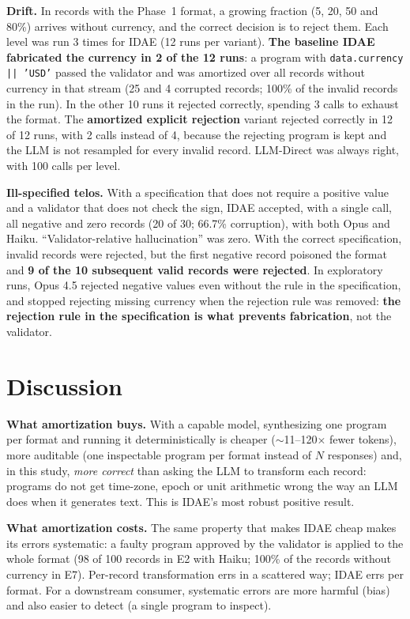 \documentclass[sigconf,nonacm]{acmart}
\begin{document}
\textbf{Drift.} In records with the Phase~1 format, a growing fraction (5, 20, 50 and 80\%) arrives without currency, and the correct decision is to reject them. Each level was run 3 times for IDAE (12 runs per variant). \textbf{The baseline IDAE fabricated the currency in 2 of the 12 runs}: a program with \texttt{data.currency || 'USD'} passed the validator and was amortized over all records without currency in that stream (25 and 4 corrupted records; 100\% of the invalid records in the run). In the other 10 runs it rejected correctly, spending 3 calls to exhaust the format. The \textbf{amortized explicit rejection} variant rejected correctly in 12 of 12 runs, with 2 calls instead of 4, because the rejecting program is kept and the LLM is not resampled for every invalid record. LLM-Direct was always right, with 100 calls per level.

\textbf{Ill-specified telos.} With a specification that does not require a positive value and a validator that does not check the sign, IDAE accepted, with a single call, all negative and zero records (20 of 30; 66.7\% corruption), with both Opus and Haiku. ``Validator-relative hallucination'' was zero. With the correct specification, invalid records were rejected, but the first negative record poisoned the format and \textbf{9 of the 10 subsequent valid records were rejected}. In exploratory runs, Opus 4.5 rejected negative values even without the rule in the specification, and stopped rejecting missing currency when the rejection rule was removed: \textbf{the rejection rule in the specification is what prevents fabrication}, not the validator.

\section{Discussion}

\textbf{What amortization buys.} With a capable model, synthesizing one program per format and running it deterministically is cheaper ($\sim$11--120$\times$ fewer tokens), more auditable (one inspectable program per format instead of $N$ responses) and, in this study, \textit{more correct} than asking the LLM to transform each record: programs do not get time-zone, epoch or unit arithmetic wrong the way an LLM does when it generates text. This is IDAE's most robust positive result.

\textbf{What amortization costs.} The same property that makes IDAE cheap makes its errors systematic: a faulty program approved by the validator is applied to the whole format (98 of 100 records in E2 with Haiku; 100\% of the records without currency in E7). Per-record transformation errs in a scattered way; IDAE errs per format. For a downstream consumer, systematic errors are more harmful (bias) and also easier to detect (a single program to inspect).
\end{document}
